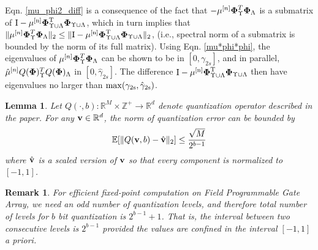 \documentclass{article}
\newtheorem{lemma}{Lemma}
\newtheorem{remark}{Remark}
\begin{document}
Eqn. \ref{mu_phi2_diff} is a consequence of the fact that $-\mu^{[n]}\boldsymbol{{\bf \Phi}}_{\Upsilon}^T\boldsymbol{{\bf \Phi}}_{\Lambda}$ is a submatrix of $\rm{I}-\mu^{[n]}\boldsymbol{{\bf \Phi}}_{\Upsilon \cup \Lambda}^T\boldsymbol{{\bf \Phi}}_{\Upsilon \cup \Lambda}$, which in turn implies that $\|\mu^{[n]}\boldsymbol{{\bf \Phi}}_{\Upsilon}^T\boldsymbol{{\bf \Phi}}_{\Lambda}\|_2 \leq \|\rm{I}-\mu^{[n]}\boldsymbol{{\bf \Phi}}_{\Upsilon \cup \Lambda}^T\boldsymbol{{\bf \Phi}}_{\Upsilon \cup \Lambda} \|_2$, (i.e., spectral norm of a submatrix is bounded by the norm of its full matrix). Using Eqn. \ref{mu*phi*phi}, the eigenvalues of $\mu^{[n]}\boldsymbol{{\bf \Phi}}_{\Upsilon}^T\boldsymbol{{\bf \Phi}}_{\Lambda}$ can be shown to be in $[0, \gamma_{2s}]$, and in parallel, $\hat{\mu}^{[n]}Q(\boldsymbol{{\bf \Phi}})_{\Upsilon}^TQ(\boldsymbol{{\bf \Phi}})_{\Lambda}$ in $[0, \hat{\gamma}_{2s}]$. The difference $\rm{I}-\mu^{[n]}\boldsymbol{{\bf \Phi}}_{\Upsilon \cup \Lambda}^T\boldsymbol{{\bf \Phi}}_{\Upsilon \cup \Lambda}$ then have eigenvalues no larger than $\rm{max}(\gamma_{2s}, \hat{\gamma}_{2s})$.
\begin{lemma}\label{lemma_on_quantized_vector}
Let $Q(\cdot, b): \mathbb{R}^M\times \mathbb{Z}^+ \rightarrow \mathbb{R}^d$ denote quantization operator described in the paper. For any ${\bf v}\in \mathbb{R}^d$, the norm of quantization error can be bounded by
\begin{equation}\label{quantization_error}
    \mathbb{E}[\| Q({\bf v}, b) - \hat{\bf v}\|_2] \leq \frac{\sqrt{M}}{2^{b-1}}
\end{equation}
where $\hat{\bf v}$ is a scaled version of ${\bf v}$ so that every component is normalized to $[-1, 1]$.
\end{lemma}
\begin{remark}
For efficient fixed-point computation on Field Programmable Gate Array, we need an odd number of quantization levels, and therefore total number of levels for $b$ bit quantization is $2^{b-1}+1$. That is, the interval between two consecutive levels is $2^{b-1}$ provided the values are confined in the interval $[-1, 1]$ a priori.
\end{remark}
\end{document}
